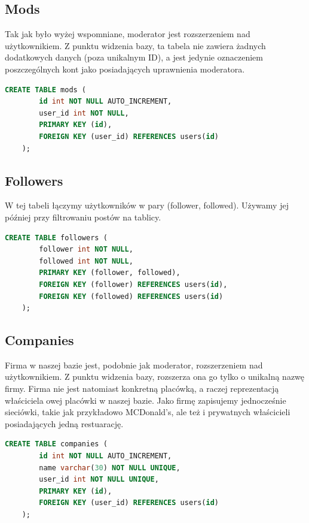 \documentclass{report}
\begin{document}
\subsection*{Mods}
Tak jak było wyżej wspomniane, moderator jest rozszerzeniem nad
użytkownikiem. Z punktu widzenia bazy, ta tabela nie zawiera żadnych
dodatkowych danych (poza unikalnym ID), a jest jedynie oznaczeniem
poszczególnych kont jako posiadających uprawnienia moderatora.
\begin{lstlisting}[language=SQL]
    CREATE TABLE mods (
        id int NOT NULL AUTO_INCREMENT, 
        user_id int NOT NULL,
        PRIMARY KEY (id),
        FOREIGN KEY (user_id) REFERENCES users(id)
    );
\end{lstlisting}

\subsection*{Followers}
W tej tabeli łączymy użytkowników w pary (follower, followed).
Używamy jej później przy filtrowaniu postów na tablicy.
\begin{lstlisting}[language=SQL]
    CREATE TABLE followers (
        follower int NOT NULL, 
        followed int NOT NULL, 
        PRIMARY KEY (follower, followed),
        FOREIGN KEY (follower) REFERENCES users(id),
        FOREIGN KEY (followed) REFERENCES users(id)
    );
\end{lstlisting}


\subsection*{Companies}
Firma w naszej bazie jest, podobnie jak moderator, rozszerzeniem
nad użytkownikiem. Z punktu widzenia bazy, rozszerza ona go tylko o
unikalną nazwę firmy. Firma nie jest natomiast konkretną placówką,
a raczej reprezentacją właściciela owej placówki w naszej bazie.
Jako firmę zapisujemy jednocześnie sieciówki, takie jak przykładowo
MCDonald's, ale też i prywatnych właścicieli posiadających jedną
restuarację.
\begin{lstlisting}[language=SQL]
    CREATE TABLE companies ( 
        id int NOT NULL AUTO_INCREMENT,
        name varchar(30) NOT NULL UNIQUE,
        user_id int NOT NULL UNIQUE,
        PRIMARY KEY (id),
        FOREIGN KEY (user_id) REFERENCES users(id)
    );
\end{lstlisting}
\end{document}
